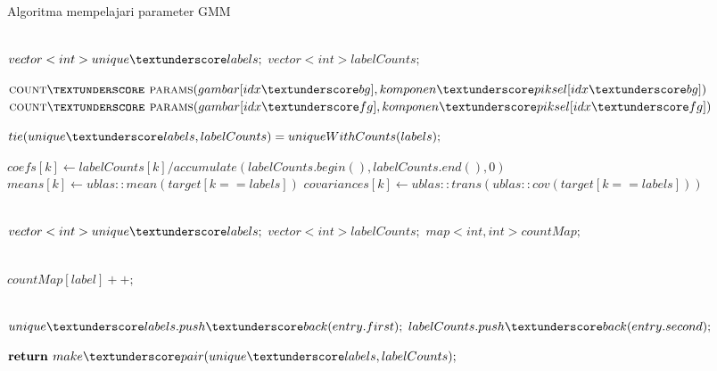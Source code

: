 \begin{algorithm}
    \caption{Algoritma mempelajari parameter GMM}          
    \label{algo:learn_GMM}                 
    \begin{algorithmic}            %
        \\  
        \State $vector<int> unique\textunderscore labels;$
        \State $vector<int> labelCounts;$
    
            \State $\Call{count\textunderscore params}{gambar[idx\textunderscore bg], komponen\textunderscore piksel[idx\textunderscore bg]} $
            \State $\Call{count\textunderscore params}{gambar[idx\textunderscore fg], komponen\textunderscore piksel[idx\textunderscore fg]} $
        \EndFunction

            \State $tie(unique\textunderscore labels, labelCounts) = uniqueWithCounts(labels);$

                \State $coefs[k] \gets labelCounts[k] / accumulate(labelCounts.begin(), labelCounts.end(), 0)$
                \State $means[k] \gets ublas::mean(target[k == labels])$
                \State $covariances[k] \gets ublas::trans(ublas::cov(target[k == labels]))$
            \EndFor
        \EndFunction

        \\ 
            \State $vector<int> unique\textunderscore labels;$
            \State $vector<int> labelCounts;$
            \State $map<int, int> countMap;$
        
            \\ 
                \State $countMap[label]++;$
            \EndFor
        
            \\ 
                \State $unique\textunderscore labels.push\textunderscore back(entry.first);$
                \State $labelCounts.push\textunderscore back(entry.second);$
            \EndFor
        
            \State $\textbf{return } make\textunderscore pair(unique\textunderscore labels, labelCounts);$
        \EndFunction
    \end{algorithmic}
\end{algorithm}

